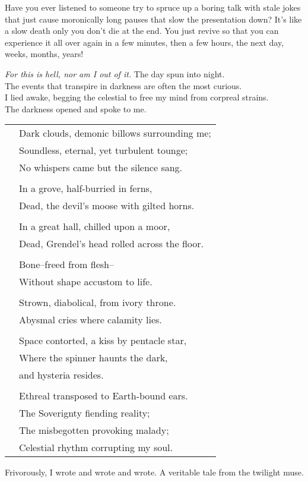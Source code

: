 Have you ever listened to someone try to spruce up
a boring talk with stale jokes that just cause
moronically long pauses that slow the presentation
down?  It's like a slow death only you don't die at
the end.  You just revive so that you can experience
it all over again in a few minutes, then a few hours,
the next day, \large{}weeks, \Large{}months, \LARGE{}years!\normalsize
\VV


\textit{For this is hell, nor am I out of it.}
\lhoarb
\noindent
The day spun into night. \\
The events that transpire in darkness are often the most curious. \\
I lied awake, begging the celestial to free my mind from corpreal strains. \\
The darkness opened and spoke to me.
\vv

\singlespace
\begin{tabular}{ll}
& Dark clouds, demonic billows surrounding me; \\
& Soundless, eternal, yet turbulent tounge; \\
& No whispers came but the silence sang. \\
&\\
& In a grove, half-burried in ferns, \\
& Dead, the devil's moose with gilted horns. \\
&\\
& In a great hall, chilled upon a moor, \\
& Dead, Grendel's head rolled across the floor. \\
&\\
& Bone--freed from flesh-- \\
& Without shape accustom to life. \\
&\\
& Strown, diabolical, from ivory throne. \\
& Abysmal cries where calamity lies. \\
&\\
& Space contorted, a kiss by pentacle star, \\
& Where the spinner haunts the dark, \\
& and hysteria resides. \\
&\\
& Ethreal transposed to Earth-bound ears. \\
& The Soverignty fiending reality; \\
& The misbegotten provoking malady; \\
& Celestial rhythm corrupting my soul. \\
\end{tabular}
\revertspace\VV


\noindent
Frivorously, I wrote and wrote and wrote.
A veritable tale from the twilight muse.
%
%
\lhoarb
